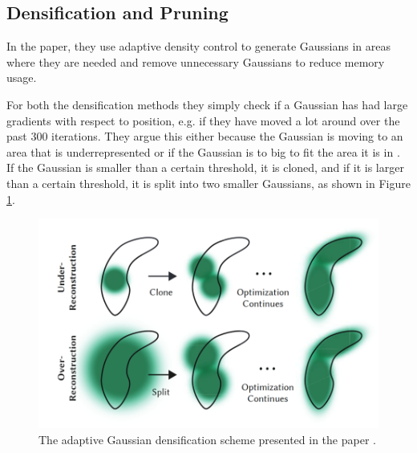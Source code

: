 \subsection{Densification and Pruning}
In the paper, they use adaptive density control to generate Gaussians in areas where they are needed and remove unnecessary Gaussians to reduce memory usage.

For both the densification methods they simply check if a Gaussian has had large gradients with respect to position, e.g. if they have moved a lot around over the past 300 iterations.
They argue this either because the Gaussian is moving to an area that is underrepresented or if the Gaussian is to big to fit the area it is in \cite[Sec 5.2]{kerbl3DGaussianSplatting2023}.
If the Gaussian is smaller than a certain threshold, it is cloned, and if it is larger than a certain threshold, it is split into two smaller Gaussians, as shown in Figure \ref{fig:densification}.

\begin{figure}
    \centering
    \includegraphics[width=\linewidth]{images/densification.png}
    \caption{The adaptive Gaussian densification scheme presented in the paper \cite[Fig. 4]{kerbl3DGaussianSplatting2023}.}
    \label{fig:densification}
\end{figure}
